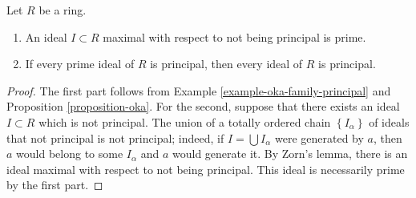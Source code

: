 \begin{lemma}
\label{lemma-primes-principal}
Let $R$ be a ring.
\begin{enumerate}
\item An ideal $I \subset R$ maximal with respect to not being
principal is prime.
\item If every prime ideal of $R$ is principal, then
every ideal of $R$ is principal.
\end{enumerate}
\end{lemma}

\begin{proof}
The first part follows from
Example \ref{example-oka-family-principal} and
Proposition \ref{proposition-oka}.
For the second, suppose that there exists an ideal $I \subset R$
which is not principal. The union of a totally ordered chain
$\left\{I_\alpha\right\}$ of ideals that not principal is not principal;
indeed, if $I = \bigcup I_\alpha$ were generated by
$a$, then $a$ would belong to some $I_\alpha $ and $a$ would generate it.
By Zorn's lemma, there is an ideal maximal with respect to not being
principal. This ideal is necessarily prime by the first part.
\end{proof}